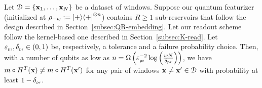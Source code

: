\begin{proposition}\label{prop:set-injectivity}
    Let ${\mathcal{D}} = \{{\mathbf{x}}_1, \ldots, {\mathbf{x}}_N\}$ be a dataset of windows. Suppose our quantum featurizer (initialized at $\rho_{-w} := \ket{+}\!\bra{+}^{\otimes n}$) contains $R \geq 1$ sub-reservoirs that follow the design described in Section~\ref{subsec:QR-embedding}. Let our readout scheme follow the kernel-based one described in Section~\ref{subsec:K-read}. Let $\varepsilon_{\scriptscriptstyle \operatorname{pr}}, \delta_{\scriptscriptstyle \operatorname{pr}}  \in (0,1)$ be, respectively, a tolerance and a failure probability choice. Then, with a number of qubits as low as $n = \Omega\left(\varepsilon_{\scriptscriptstyle \operatorname{pr}}^{-2} \log\left(\tfrac{w N}{\delta_{\scriptscriptstyle \operatorname{pr}}}\right)\right)$, we have $m \circ H^T({\mathbf{x}}) \neq m \circ H^T({\mathbf{x}}')$ for any pair of windows ${\mathbf{x}} \neq {\mathbf{x}}' \in {\mathcal{D}}$ with probability at least $1 - \delta_{\scriptscriptstyle \operatorname{pr}}$.
\end{proposition}

